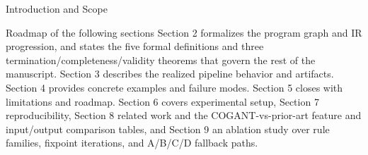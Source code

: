 \documentclass[
  ignorenonframetext,
]{beamer}
\begin{document}
\begin{frame}[fragile]{Introduction and Scope}
\begin{block}{Roadmap of the following sections}
\protect{}\label{roadmap-of-the-following-sections}
Section 2 formalizes the program graph and IR progression, and states
the five formal definitions and three termination/completeness/validity
theorems that govern the rest of the manuscript. Section 3 describes the
realized pipeline behavior and artifacts. Section 4 provides concrete
examples and failure modes. Section 5 closes with limitations and
roadmap. Section 6 covers experimental setup, Section 7 reproducibility,
Section 8 related work and the COGANT-vs-prior-art feature and
input/output comparison tables, and Section 9 an ablation study over
rule families, fixpoint iterations, and A/B/C/D fallback paths.
\end{block}
\end{frame}
\end{document}
